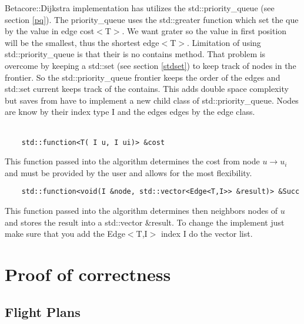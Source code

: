 \documentclass[12pt]{article}
\begin{document}
Betacore::Dijkstra implementation has utilizes the std::priority\_queue (see section \ref{pq}).
The priority\_queue uses the std::greater function which set the que by the value in edge cost$<$T$>$. We want grater
so the value in first position will be the smallest, thus the shortest edge$<$T$>$. 
Limitation of using std::priority\_queue is that their is no contains method. That 
problem is overcome by keeping a std::set (see section \ref{stdset}) to keep track of nodes in the frontier.
So the std::priority\_queue frontier keeps the order of the edges and std::set current keeps track of the contains.
This adds double space complexity but saves from have to implement a new child class of std::priority\_queue. Nodes 
are know by their index type I and the edges edges by the edge class.
\\
\\
\begin{lstlisting}
	std::function<T( I u, I ui)> &cost
\end{lstlisting}
This function passed into the algorithm determines the cost from node $u \to u_i$ and 
must be provided by the user and allows for the most flexibility.
\\
\begin{lstlisting}
	std::function<void(I &node, std::vector<Edge<T,I>> &result)> &Succ
\end{lstlisting}
This function passed into the algorithm determines then neighbors nodes of $u$ and
stores the result into a std::vector \&result. To change the implement just make sure
that you add the Edge$<$T,I$>$ index I do the vector list.

\section{Proof of correctness}

\subsection{Flight Plans}
\end{document}
